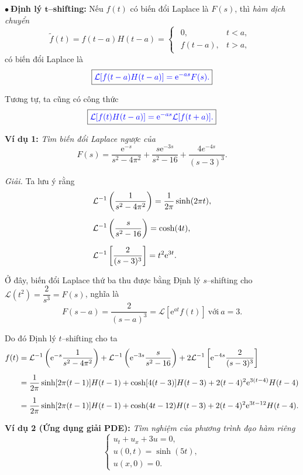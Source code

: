 \documentclass[10pt, a4paper]{article}
\begin{document}
	$\bullet~$\textbf{Định lý $\mathbf t$--shifting:} Nếu $f(t)$ có biến đổi Laplace là $F(s)$, thì \textit{hàm dịch chuyển} $$\widetilde f(t)=f(t-a)H(t-a)=\begin{cases}
		\begin{array}{ll}
			0, & t<a, \\
			f(t-a), & t>a,
		\end{array}
	\end{cases}$$
	có biến đổi Laplace là $$\boxed{\color{blue}\mathcal L[f(t-a)H(t-a)]=\mathrm e^{-as}F(s).}$$
	
	Tương tự, ta cũng có công thức $$\boxed{\color{blue}\mathcal L[f(t)H(t-a)]=\mathrm e^{-as}\mathcal L[f(t+a)].}$$
	
	\textbf{Ví dụ 1:} \textit{Tìm biến đổi Laplace ngược của} $$F(s)=\frac{\mathrm e^{-s}}{s^2-4\pi^2}+\frac{s\mathrm e^{-3s}}{s^2-16}+\frac{\mathrm 4e^{-4s}}{(s-3)^3}.$$
	
	\textit{Giải.} Ta lưu ý rằng \begin{align*}
		&\mathcal L^{-1}\left(\frac{1}{s^2-4\pi^2}\right)=\frac{1}{2\pi}\sinh(2\pi t),\\
		\noalign{\vskip5pt}
		&\mathcal L^{-1}\left(\frac{s}{s^2-16}\right)=\cosh(4t),\\
		\noalign{\vskip5pt}
		&\mathcal L^{-1}\left[\frac{2}{(s-3)^3}\right]=t^2\mathrm e^{3t}.
	\end{align*}
	
	Ở đây, biến đổi Laplace thứ ba thu được bằng Định lý $s$--shifting cho $\mathcal L(t^2)=\dfrac{2}{s^3}=F(s)$, nghĩa là $$F(s-a)=\frac{2}{(s-a)^3}=\mathcal L[\mathrm e^{at}f(t)]~\text{với}~a=3.$$
	
	Do đó Định lý $t$--shifting cho ta \begin{align*}
		f(t)&=\mathcal L^{-1}\left(\mathrm e^{-s}\frac{1}{s^2-4\pi^2}\right)+\mathcal L^{-1}\left(\mathrm e^{-3s}\frac{s}{s^2-16}\right)+2\mathcal L^{-1}\left[\mathrm e^{-4s}\frac{2}{(s-3)^3}\right]\\
		\noalign{\vskip5pt}
		&=\frac{1}{2\pi}\sinh[2\pi(t-1)]H(t-1)+\cosh[4(t-3)]H(t-3)+2(t-4)^2\mathrm e^{3(t-4)}H(t-4)\\
		\noalign{\vskip5pt}
		&=\frac{1}{2\pi}\sinh[2\pi(t-1)]H(t-1)+\cosh(4t-12)H(t-3)+2(t-4)^2\mathrm e^{3t-12}H(t-4).
	\end{align*}
	
	\textbf{Ví dụ 2 (Ứng dụng giải PDE):} \textit{Tìm nghiệm của phương trình đạo hàm riêng} $$\begin{cases}
		u_t+u_x+3u=0,\\
		u(0,t)=\sinh(5t),\\
		u(x,0)=0.
	\end{cases}$$
	
\end{document}
